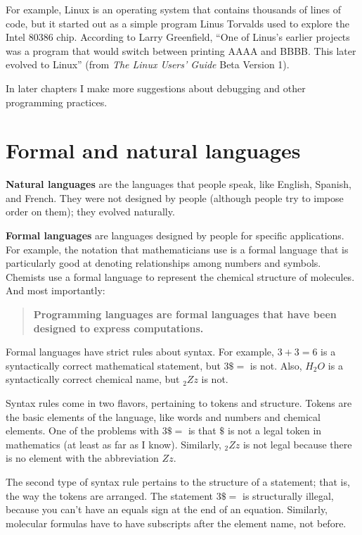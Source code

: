 \documentclass[12pt]{book}
\theoremstyle{exercise}
\begin{document}
For example, Linux is an operating system that contains thousands of
lines of code, but it started out as a simple program Linus Torvalds
used to explore the Intel 80386 chip.  According to Larry Greenfield,
``One of Linus's earlier projects was a program that would switch
between printing AAAA and BBBB.  This later evolved to Linux''
(from {\em The Linux Users' Guide} Beta Version 1).


In later chapters I make more suggestions about debugging
and other programming practices.

\section{Formal and natural languages}

{\bf Natural languages} are the languages that people speak,
like English, Spanish, and French.  They were not designed
by people (although people try to impose order on them);
they evolved naturally.

{\bf Formal languages} are languages designed by people for
specific applications.  For example, the notation that mathematicians
use is a formal language that is particularly good at denoting
relationships among numbers and symbols.  Chemists use a formal
language to represent the chemical structure of molecules.  And
most importantly:

\begin{quote}
{\bf Programming languages are formal languages that have been
designed to express computations.}
\end{quote}

Formal languages have strict rules
about syntax.  For example, $3+3=6$ is a syntactically correct
mathematical statement, but $3 \$ =$ is not.  Also, $H_2O$ is a
syntactically correct chemical name, but $_2Zz$ is not.

Syntax rules come in two flavors, pertaining to tokens and structure.
Tokens are the basic elements of the language, like words and numbers
and chemical elements.  One of the problems with $3 \$ =$ is that
$\$$ is not a legal token in mathematics (at least as far as I
know).  Similarly, $_2Zz$ is not legal because there is no element with
the abbreviation $Zz$.

The second type of syntax rule pertains to the structure of a
statement; that is, the way the tokens are arranged.  The statement
$3 \$ =$ is structurally illegal, because you can't have an equals
sign at the end of an equation.  Similarly, molecular formulas
have to have subscripts after the element name, not before.
\end{document}
